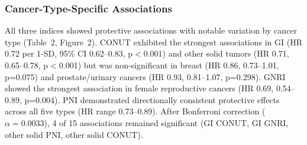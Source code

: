 \documentclass[review]{elsarticle}
\begin{document}
\subsubsection{Cancer-Type-Specific Associations}

All three indices showed protective associations with notable variation by cancer type (Table~2, Figure~2). CONUT exhibited the strongest associations in GI (HR 0.72 per 1-SD, 95\% CI 0.62--0.83, p$<$0.001) and other solid tumors (HR 0.71, 0.65--0.78, p$<$0.001) but was non-significant in breast (HR 0.86, 0.73--1.01, p=0.075) and prostate/urinary cancers (HR 0.93, 0.81--1.07, p=0.298). GNRI showed the strongest association in female reproductive cancers (HR 0.69, 0.54--0.89, p=0.004). PNI demonstrated directionally consistent protective effects across all five types (HR range 0.73--0.89). After Bonferroni correction ($\alpha=0.0033$), 4 of 15 associations remained significant (GI CONUT, GI GNRI, other solid PNI, other solid CONUT).
\end{document}

